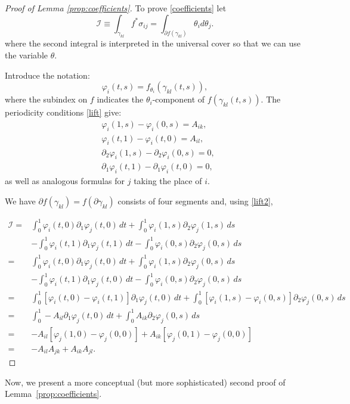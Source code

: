 \documentclass[11pt]{amsart}
\theoremstyle{definition}
\theoremstyle{remark}
\numberwithin{equation}{section}
\begin{document}
\begin{proof}[Proof of Lemma \ref{prop:coefficients}]
To prove \eqref{coefficients} let
\[
\mathcal{I} \equiv
\int_{\gamma_{kl}}f^*\sigma_{ij} =
\int_{\partial f(\gamma_{kl})} \theta_i d\theta_j .
\]
where the second integral is interpreted in the universal cover so
that we can use the variable $\theta$.

Introduce the notation:
\def\p{ {\varphi}}
\[
\p_i(t,s) = f_{\theta_i}(\gamma_{kl}(t,s)),
\]
where the subindex on $f$ indicates the
$\theta_i$-component of $f(\gamma_{kl}(t,s))$.
The periodicity conditions
\eqref{lift} give:
\begin{equation}
  \label{lift2}
\begin{split}
  & \p_i(1,s) - \p_i(0,s) = A_{ik} ,\\
  & \p_i(t,1) - \p_i(t,0) = A_{il} ,\\
  & \partial_2  \p_i(1,s) - \partial_2 \p_i(0,s)  = 0 ,\\
  & \partial_1  \p_i(t,1) -  \partial_1\p_i(t,0)  = 0 ,
\end{split}
\end{equation}
as well as analogous formulas for $j$ taking the place of $i$.

We have $\partial f(\gamma_{kl})= f(\partial \gamma_{kl})$ consists of
four segments and, using \eqref{lift2},

\[
\begin{split}
\mathcal{I} =
  &\int_0^1 \p_i(t,0) \partial_1 \p_j(t,0) \, dt
   +\int_0^1 \p_i(1,s) \partial_2 \p_j(1,s) \,ds \\
    &-\int_0^1 \p_i(t,1) \partial_1 \p_j(t,1) \, dt
  - \int_0^1 \p_i(0,s) \partial_2 \p_j(0,s) \,ds \\
= &\int_0^1 \p_i(t,0) \partial_1 \p_j(t,0) \, dt
   +\int_0^1 \p_i(1,s) \partial_2 \p_j(0,s) \,ds\\
           &-\int_0^1 \p_i(t,1) \partial_1 \p_j(t,0) \, dt
- \int_0^1 \p_i(0,s) \partial_2 \p_j(0,s) \,ds \\
= &\int_0^1 [ \p_i(t,0) - \p_i(t,1)] \partial_1 \p_j(t,0) \, dt +\int_0^1[\p_i(1,s) - \p_i(0,s)] \partial_2 \p_j(0,s) \, ds \\
= &\int_0^1 - A_{il} \partial_1 \p_j(t,0) \, dt +\int_0^1A_{ik}  \partial_2 \p_j(0,s) \, ds \\
= & -A_{il} [\p_j(1,0) - \p_j(0,0)] + A_{ik} [\p_j(0,1) - \p_j(0,0)] \\
= & -A_{il} A_{jk} + A_{ik}A_{jl} .
\end{split}
\]



\end{proof}
  Now, we present a more conceptual (but more sophisticated)  second
proof of Lemma~\ref{prop:coefficients}.
\end{document}
